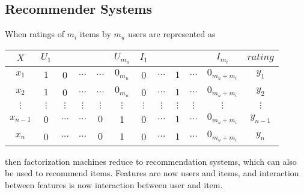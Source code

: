 \documentclass[14pt, reqno]{amsart}
\theoremstyle{definition}
\begin{document}
\subsection{Recommender Systems}\label{recommender_systems} When ratings of $m_i$ items by $m_u$ users are represented as
\vspace{10pt}
\begin{center}
\begin{tabular}{c | c c c c c c c c c c | c}
$X$ & $U_1$ & & & & $U_{m_u}$ & $I_1$ & & & & $I_{m_i}$ & $rating$ \\
\hline
$x_1$ & $1$ & 0 & $\dots$ & $\dots$ & $0_{m_u}$ & 0 & $\dots$ & $1$ & $\dots$ & $0_{m_u + m_i}$ & $y_1$ \\
$x_2$ & $1$ & 0 & $\dots$ & $\dots$ & $0_{m_u}$ & 0 & $\dots$ & $1$ & $\dots$ & $0_{m_u + m_i}$ & $y_2$ \\
$\vdots$ & $\vdots$ & $\vdots$ & $\vdots$ & $\vdots$ & $\vdots$ & $\vdots$ & $\vdots$ & $\vdots$ & $\vdots$ & $\vdots$ & $\vdots$ \\
$x_{n-1}$ & 0 & $\dots$ & $\dots$ & $0$ & 1 & 0 & $\dots$ & $1$ & $\dots$ & $0_{m_u + m_i}$ & $y_{n-1}$ \\
$x_n$ & 0 & $\dots$ & $\dots$ & $0$ & $1$ & 0 & $\dots$ & $1$ & $\dots$ & $0_{m_u + m_i}$ & $y_n$ \\
\end{tabular}
\end{center}
\vspace{10pt}
then factorization machines reduce to recommendation systems, which can also be used to recommend items. Features are now users and items, and interaction between features is now interaction between user and item.
\end{document}
